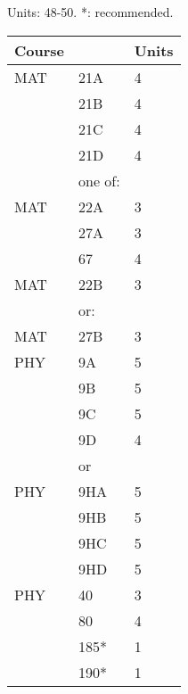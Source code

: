 \documentclass[12pt]{article}
\begin{document}
\noindent
\vskip 0.25cm
\begin{center}
Units:  48-50. *: recommended.\\
\begin{tabular}{|lll|}
\hline
Course & & Units \\
\hline
MAT & 21A & 4 \\  
    & 21B & 4 \\ 
    & 21C & 4 \\ 
    & 21D & 4 \\
\hline
\hline
    & one of: & \\
\hline
MAT & 22A & 3 \\
    & 27A & 3 \\
    & 67  & 4 \\
\hline
\hline
MAT & 22B & 3 \\ 
    & or: & \\
MAT & 27B & 3 \\ 
\hline
\hline
PHY & 9A & 5 \\  
    & 9B & 5 \\  
    & 9C & 5 \\  
    & 9D & 4 \\  
\hline
&or&\\
\hline
PHY & 9HA & 5 \\  
    & 9HB & 5 \\  
    & 9HC & 5 \\  
    & 9HD & 5 \\  
\hline
\hline
PHY & 40   & 3 \\
    & 80   & 4 \\ 
    & 185* & 1 \\ 
    & 190* & 1 \\ 
\hline
\end{tabular}
\end{center}
\end{document}

